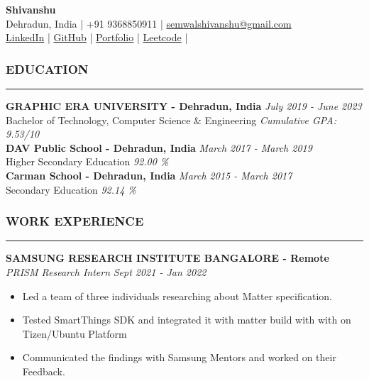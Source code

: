 \documentclass[a4paper]{article}
\begin{document}
\begin{center}
    \textbf{\huge{Shivanshu}} \\
    Dehradun, India |
    +91 9368850911 |
    \href{mailto://semwalshivanshu@gmail.com}{semwalshivanshu@gmail.com}\\
    \href{https://www.linkedin.com/in/shivanshu-semwal/}{LinkedIn} |
    \href{https://github.com/shivanshu-semwal}{GitHub} |
    \href{https://shivanshu-semwal.github.io/}{Portfolio} |
    \href{https://leetcode.com/semwalshivanshu/}{Leetcode} |
\end{center}

\subsubsection*{EDUCATION}
\hrule
\vspace{10pt}

\noindent
\textbf{GRAPHIC ERA UNIVERSITY - Dehradun, India} \hfill  \textit{July 2019 - June 2023} \\
Bachelor of Technology, Computer Science \& Engineering \hfill \textit{Cumulative GPA: 9.53/10} \\

\noindent
\textbf{DAV Public School - Dehradun, India} \hfill \textit{March 2017 - March 2019} \\
Higher Secondary Education \hfill \textit{92.00 \%} \\

\noindent
\textbf{Carman School - Dehradun, India} \hfill \textit{March 2015 - March 2017} \\
Secondary Education \hfill \textit{92.14 \%}

\subsubsection*{WORK EXPERIENCE}
\hrule
\vspace{10pt}

\noindent
\textbf{SAMSUNG RESEARCH INSTITUTE BANGALORE - Remote} \\
\textit{PRISM Research Intern} \hfill \textit{Sept 2021 - Jan 2022}
\begin{itemize} [leftmargin=*,nosep]
    \item Led a team of three individuals researching about Matter specification.
    \item Tested SmartThings SDK and integrated it with matter build with with on Tizen/Ubuntu Platform
    \item Communicated the findings with Samsung Mentors and worked on their Feedback.
\end{itemize}
\end{document}

